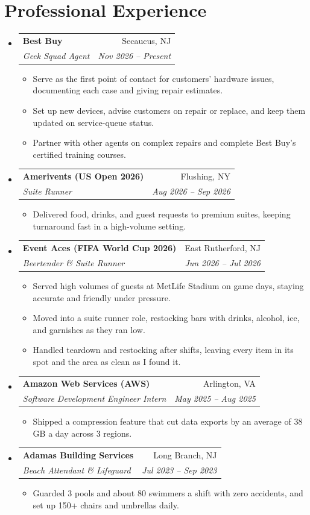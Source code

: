 \documentclass[letterpaper,11pt]{article}
\makeatletter
\newcommand{\resumeItem}[1]{\item\small{#1}}
\newcommand{\resumeSubheading}[4]{
  \vspace{-2pt}\item
    \begin{tabular*}{0.97\textwidth}[t]{l@{\extracolsep{\fill}}r}
      \textbf{#1} & #2 \\
      \textit{\small#3} & \textit{\small #4} \\
    \end{tabular*}\vspace{-7pt}
}
\newcommand{\resumeSubHeadingListStart}{\begin{itemize}[leftmargin=0.15in, label={}, itemsep=1pt, parsep=0pt, topsep=2pt]}
\newcommand{\resumeSubHeadingListEnd}{\end{itemize}}
\newcommand{\resumeItemListStart}{\begin{itemize}[topsep=6pt,itemsep=0pt,parsep=0pt,partopsep=0pt]}
\newcommand{\resumeItemListEnd}{\end{itemize}\vspace{-5pt}}
\makeatother
\begin{document}
\section{Professional Experience}
  \resumeSubHeadingListStart
    \resumeSubheading
      {Best Buy}{Secaucus, NJ}
      {Geek Squad Agent}{Nov 2026 -- Present}
      \resumeItemListStart
        \resumeItem{Serve as the first point of contact for customers' hardware issues, documenting each case and giving repair estimates.}
        \resumeItem{Set up new devices, advise customers on repair or replace, and keep them updated on service-queue status.}
        \resumeItem{Partner with other agents on complex repairs and complete Best Buy's certified training courses.}
      \resumeItemListEnd
    \resumeSubheading
      {Amerivents (US Open 2026)}{Flushing, NY}
      {Suite Runner}{Aug 2026 -- Sep 2026}
      \resumeItemListStart
        \resumeItem{Delivered food, drinks, and guest requests to premium suites, keeping turnaround fast in a high-volume setting.}
      \resumeItemListEnd
    \resumeSubheading
      {Event Aces (FIFA World Cup 2026)}{East Rutherford, NJ}
      {Beertender \& Suite Runner}{Jun 2026 -- Jul 2026}
      \resumeItemListStart
        \resumeItem{Served high volumes of guests at MetLife Stadium on game days, staying accurate and friendly under pressure.}
        \resumeItem{Moved into a suite runner role, restocking bars with drinks, alcohol, ice, and garnishes as they ran low.}
        \resumeItem{Handled teardown and restocking after shifts, leaving every item in its spot and the area as clean as I found it.}
      \resumeItemListEnd
    \resumeSubheading
      {Amazon Web Services (AWS)}{Arlington, VA}
      {Software Development Engineer Intern}{May 2025 -- Aug 2025}
      \resumeItemListStart
        \resumeItem{Shipped a compression feature that cut data exports by an average of 38 GB a day across 3 regions.}
      \resumeItemListEnd
    \resumeSubheading
      {Adamas Building Services}{Long Branch, NJ}
      {Beach Attendant \& Lifeguard}{Jul 2023 -- Sep 2023}
      \resumeItemListStart
        \resumeItem{Guarded 3 pools and about 80 swimmers a shift with zero accidents, and set up 150+ chairs and umbrellas daily.}
      \resumeItemListEnd
  \resumeSubHeadingListEnd
\end{document}
